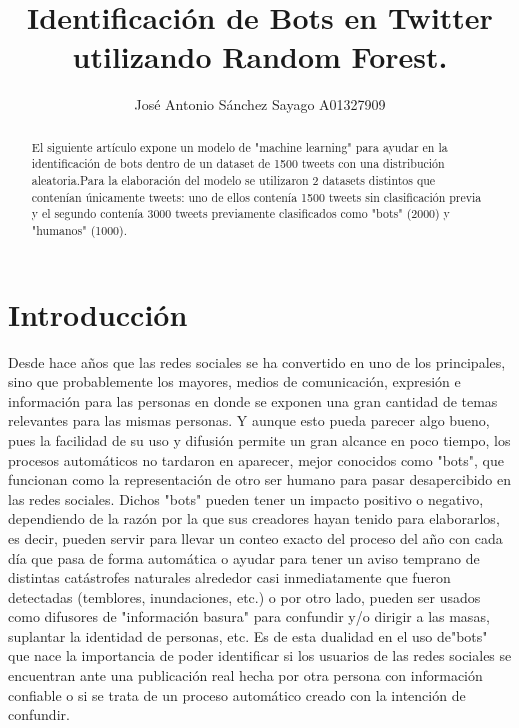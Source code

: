 \documentclass[runningheads]{llncs}
\begin{document}
%
\title{Identificación de Bots en Twitter utilizando Random Forest.}
%
%
\author{José Antonio Sánchez Sayago A01327909}
%

%
%
\maketitle              %
%
\begin{abstract} 
El siguiente artículo expone un modelo de "machine learning" para ayudar en la identificación de bots dentro de un dataset de 1500 tweets con una distribución aleatoria.Para la elaboración del modelo se utilizaron 2 datasets distintos que contenían únicamente tweets: uno de ellos contenía 1500 tweets sin clasificación previa y el segundo contenía 3000 tweets previamente clasificados como "bots" (2000) y "humanos" (1000).

\end{abstract}
%
%
%
\section{Introducción}
Desde hace años que las redes sociales se ha convertido en uno de los principales, sino que probablemente los mayores, medios de comunicación, expresión e información para las personas en donde se exponen una gran cantidad de temas relevantes para las mismas personas. Y aunque esto pueda parecer algo bueno, pues la facilidad de su uso y difusión permite un gran alcance en poco tiempo, los procesos automáticos no tardaron en aparecer, mejor conocidos como "bots", que funcionan como la representación de otro ser humano para pasar desapercibido en las redes sociales. Dichos "bots" pueden tener un impacto positivo o negativo, dependiendo de la razón por la que sus creadores hayan tenido para elaborarlos, es decir, pueden servir para llevar un conteo exacto del proceso del año con cada día que pasa de forma automática o ayudar para tener un aviso temprano de distintas catástrofes naturales alrededor casi inmediatamente que fueron detectadas (temblores, inundaciones, etc.) o por otro lado, pueden ser usados como difusores de "información basura" para confundir y/o dirigir a las masas, suplantar la identidad de personas, etc.
Es de esta dualidad en el uso de"bots" que nace la importancia de poder identificar si los usuarios de las redes sociales se encuentran ante una publicación real hecha por otra persona con información confiable o si se trata de un proceso automático creado con la intención de confundir.
\end{document}
